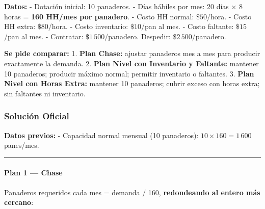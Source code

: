 \documentclass[
]{article}
\begin{document}
\textbf{Datos:} - Dotación inicial: 10 panaderos. - Días hábiles por
mes: 20 días × 8 horas = \textbf{160 HH/mes por panadero}. - Costo HH
normal: \(\$50\)/hora. - Costo HH extra: \(\$80\)/hora. - Costo
inventario: \(\$10\)/pan al mes. - Costo faltante: \(\$15\)/pan al mes.
- Contratar: \(\$1\,500\)/panadero. Despedir: \(\$2\,500\)/panadero.

\textbf{Se pide comparar:} 1. \textbf{Plan Chase:} ajustar panaderos mes
a mes para producir exactamente la demanda. 2. \textbf{Plan Nivel con
Inventario y Faltante:} mantener 10 panaderos; producir máximo normal;
permitir inventario o faltantes. 3. \textbf{Plan Nivel con Horas Extra:}
mantener 10 panaderos; cubrir exceso con horas extra; sin faltantes ni
inventario.

\hypertarget{soluciuxf3n-oficial}{%
\subsubsection{Solución Oficial}\label{soluciuxf3n-oficial}}

\textbf{Datos previos:} - Capacidad normal mensual (10 panaderos):
\(10 \times 160 = 1\,600\) panes/mes.

\begin{center}\rule{0.5\linewidth}{0.5pt}\end{center}

\hypertarget{plan-1-chase}{%
\paragraph{Plan 1 --- Chase}\label{plan-1-chase}}

Panaderos requeridos cada mes = demanda / 160, \textbf{redondeando al
entero más cercano}:
\end{document}
